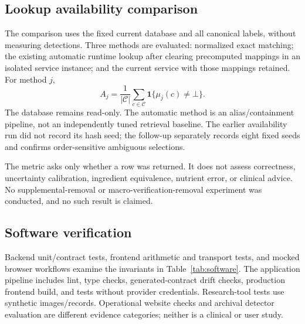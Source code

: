 \documentclass[12pt,journal,draftclsnofoot,onecolumn]{IEEEtran}
\begin{document}
\subsection{Lookup availability comparison}
The comparison uses the fixed current database and all \AuditClasses{} canonical labels, without measuring detections. Three methods are evaluated: normalized exact matching; the existing automatic runtime lookup after clearing precomputed mappings in an isolated service instance; and the current service with those mappings retained. For method $j$,
\begin{equation}
A_j=\frac{1}{|\mathcal C|}\sum_{c\in\mathcal C}\mathbf{1}\{\mu_j(c)\ne\bot\}.
\label{eq:coverage}
\end{equation}
The database remains read-only. The automatic method is an alias/containment pipeline, not an independently tuned retrieval baseline. The earlier availability run did not record its hash seed; the follow-up separately records eight fixed seeds and confirms order-sensitive ambiguous selections.

The metric asks only whether a row was returned. It does not assess correctness, uncertainty calibration, ingredient equivalence, nutrient error, or clinical advice. No supplemental-removal or macro-verification-removal experiment was conducted, and no such result is claimed.

\subsection{Software verification}
Backend unit/contract tests, frontend arithmetic and transport tests, and mocked browser workflows examine the invariants in Table~\ref{tab:software}. The application pipeline includes lint, type checks, generated-contract drift checks, production frontend build, and tests without provider credentials. Research-tool tests use synthetic images/records. Operational website checks and archival detector evaluation are different evidence categories; neither is a clinical or user study.
\end{document}

